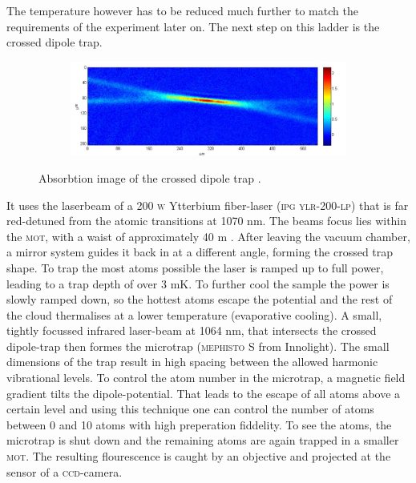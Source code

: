 The temperature however has to be reduced much further to match the requirements of the experiment later on. The next step on this ladder is the crossed dipole trap. \begin{figure}[h]
\centering
\begin{subfigure}[b]{0.8\textwidth}
                \includegraphics[width=\textwidth]{dipolefoto}
\end{subfigure}
\caption{Absorbtion image of the crossed dipole trap \cite{lompe}.}
\label{experiment}
\end{figure}
It uses the laserbeam of a 200 \textsc{w} Ytterbium fiber-laser (\textsc{ipg ylr-200-lp}) that is far red-detuned from the atomic transitions at 1070 nm. The beams focus lies within the \textsc{mot}, with a waist of approximately 40 \mu m \cite{lompe}. After leaving the vacuum chamber, a mirror system guides it back in at a different angle, forming the crossed trap shape. To trap the most atoms possible the laser is ramped up to full power, leading to a trap depth of over 3 mK. To further cool the sample the power is slowly ramped down, so the hottest atoms escape the potential and the rest of the cloud thermalises at a lower temperature (evaporative cooling). A small, tightly focussed infrared laser-beam at 1064 nm, that intersects the crossed dipole-trap then formes the microtrap (\textsc{mephisto S} from Innolight). The small dimensions of the trap result in high spacing between the allowed harmonic vibrational levels. To control the atom number in the microtrap, a magnetic field gradient tilts the dipole-potential. That leads to the escape of all atoms above a certain level and using this technique one can control the number of atoms between 0 and 10 atoms with high preperation fiddelity. To see the atoms, the microtrap is shut down and the remaining atoms are again trapped in a smaller \textsc{mot}. The resulting flourescence is caught by an objective and projected at the sensor of a \textsc{ccd}-camera. 
